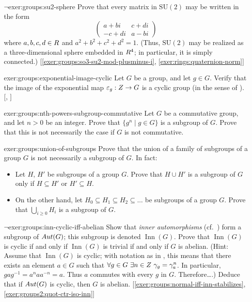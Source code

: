 \begin{exer}{$\lnot$}{exer:groups:su2-sphere}
  Prove that every matrix in $\mathrm{SU}(2)$ may be written in the
  form
  \[
    \begin{pmatrix} a+bi & c+di \\ -c+di & a-bi \end{pmatrix}
  \]
  where $a,b,c,d \in R$ and $a^2+b^2+c^2+d^2=1$. (Thus,
  $\mathrm{SU}(2)$ may be realized as a three-dimensional sphere
  embedded in $R^4$; in particular, it is simply connected.)
  [\ref{exer:groups:so3-su2-mod-plusminus-i},
  \ref{exer:rings:quaternion-norm}]
\end{exer}
\begin{exer}{\exerused}{exer:groups:exponential-image-cyclic}
  Let $G$ be a group, and let $g \in G$. Verify that the image of the
  exponential map $\varepsilon_g : Z \to G$ is a cyclic group (in the
  sense of
  ). [,
  ]
\end{exer}
\begin{exer}{}{exer:groups:nth-powers-subgroup-commutative}
  Let $G$ be a commutative group, and let $n > 0$ be an integer. Prove
  that $\{g^n \mid g \in G\}$ is a subgroup of $G$. Prove that this is
  not necessarily the case if $G$ is not commutative.
\end{exer}
\begin{exer}{}{exer:groups:union-of-subgroups}
  Prove that the union of a family of subgroups of a group $G$ is not
  necessarily a subgroup of $G$. In fact:
  \begin{itemize}
  \item Let $H$, $H'$ be subgroups of a group $G$. Prove that
    $H \cup H'$ is a subgroup of $G$ only if $H \subseteq H'$ or
    $H' \subseteq H$.
  \item On the other hand, let
    $H_0 \subseteq H_1 \subseteq H_2 \subseteq \dots$ be subgroups of
    a group $G$. Prove that $\bigcup_{i \geq 0} H_i$ is a subgroup of
    $G$.
  \end{itemize}
\end{exer}
\begin{exer}{$\lnot$}{exer:groups:inn-cyclic-iff-abelian}
  Show that \emph{inner automorphisms} (cf.\
  ) form a subgroup of
  $Aut(G)$; this subgroup is denoted $\operatorname{Inn}(G)$. Prove
  that $\operatorname{Inn}(G)$ is cyclic if and only if
  $\operatorname{Inn}(G)$ is trivial if and only if $G$ is
  abelian. (Hint: Assume that $\operatorname{Inn}(G)$ is cyclic; with
  notation as in \Cref{exer:groups:inner-automorphisms}, this means
  that there exists an element $a \in G$ such that
  $\forall g \in G\ \exists n \in \Z\ \gamma_g = \gamma_a^n$. In
  particular, $gag^{-1} = a^naa^{-n} = a$. Thus $a$ commutes with
  every $g$ in $G$. Therefore\dots.) Deduce that if $Aut(G)$ is
  cyclic, then $G$ is
  abelian. [\ref{exer:groups:normal-iff-inn-stabilizes},
  \ref{exer:groups2:quot-ctr-iso-inn}]
\end{exer}
